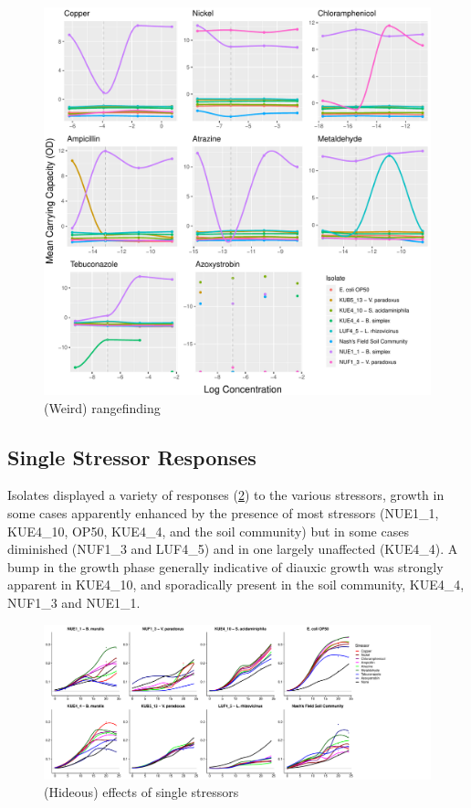 \documentclass[final,1p,times]{elsarticle}
\begin{document}
\begin{figure}[H]
    \centering
    \includegraphics[width = \textwidth]{Scripts/Results/Bug_Rangefinding/plots_rangefinding.pdf}
    \caption{(Weird) rangefinding}
    \label{fig:rangefinding}
\end{figure}

\newpage
\subsection{Single Stressor Responses}
\label{S:3:2}

Isolates displayed a variety of responses (\cref{fig:sstress}) to the various stressors, growth in some cases apparently enhanced by the presence of most stressors (NUE1\_1, KUE4\_10, OP50, KUE4\_4, and the soil community) but in some cases diminished (NUF1\_3 and LUF4\_5) and in one largely unaffected (KUE4\_4). A bump in  the growth phase generally indicative of diauxic growth was strongly apparent in KUE4\_10, and sporadically present in the soil community, KUE4\_4, NUF1\_3 and NUE1\_1. 

\begin{figure}[H]
    \centering
    \includegraphics[width = \textwidth]{Scripts/Results/Final_Pipeline/single_stressor_plots.pdf}
    \caption{(Hideous) effects of single stressors}
    \label{fig:sstress}
\end{figure}
\end{document}
